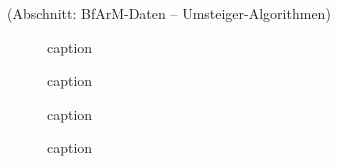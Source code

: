 



(Abschnitt: BfArM-Daten -- Umsteiger-Algorithmen)

\begin{figure}[H]
    \centering\large%
    \resizebox{.99\textwidth}{!}{}
    \normalsize\caption{caption}
\end{figure}

\newpage

\begin{figure}[H]
    \centering\large%
    \resizebox{.99\textwidth}{!}{}
    \normalsize\caption{caption}
\end{figure}

\begin{figure}[H]
    \centering\large%
    \resizebox{.99\textwidth}{!}{}
    \normalsize\caption{caption}
\end{figure}

\newpage

\begin{figure}[H]
    \centering\LARGE%
    \resizebox{.60\textwidth}{!}{}
    \normalsize\caption{caption}
\end{figure}

\newpage

